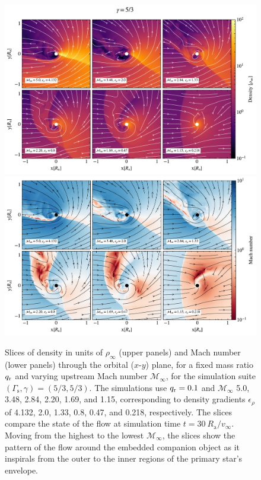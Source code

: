 \begin{figure}[t]
\centering
\includegraphics[width=13.8cm]{figures/common_envelope/sliceplot_gamma_53_q0pt1_varymach_gradient_comparison_figure_z.pdf}
\includegraphics[width=13.8cm]{figures/common_envelope/sliceplot_gamma_53_q0pt1_varymach_mach_gradient_comparison_figure_z.pdf}
\caption{Slices of density in units of $\rho_\infty$ (upper panels) and Mach number (lower panels) through the orbital ($x$-$y$) plane, for a fixed mass ratio $q_{\rm r}$ and varying upstream Mach number $\mathcal{M}_\infty$, for the simulation suite $(\Gamma_{\mathrm s}, \gamma) = (5/3, 5/3)$. The simulations use $q_{\rm r} = 0.1$ and $\mathcal{M}_\infty$ 5.0, 3.48, 2.84, 2.20, 1.69, and 1.15, corresponding to density gradients $\epsilon_\rho$ of 4.132, 2.0, 1.33, 0.8, 0.47, and 0.218, respectively. The slices compare the state of the flow at simulation time $t = 30~R_{\mathrm{a}}/v_\infty$. Moving from the highest to the lowest $\mathcal{M}_\infty$, the slices show the pattern of the flow around the embedded companion object as it inspirals from the outer to the inner regions of the primary star's envelope. \label{fig:sims_g53_fix_q_vary_mach}}
\end{figure}

